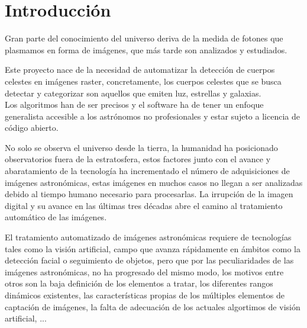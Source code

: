	\newpage
	\tableofcontents
	\newpage
	
	\section{Introducción}
	
	Gran parte del conocimiento del universo deriva de la medida de fotones que plasmamos en forma de imágenes, que más tarde son analizados y estudiados. 
	
	Este proyecto nace de la necesidad de automatizar la detección de cuerpos celestes en imágenes raster, concretamente, los cuerpos celestes que se busca detectar y categorizar son aquellos que emiten luz, estrellas y galaxias. \\
	Los algoritmos han de ser precisos y el software ha de tener un enfoque generalista accesible a los astrónomos no profesionales y estar sujeto a licencia de código abierto.
	
	No solo se observa el universo desde la tierra, la humanidad ha posicionado observatorios fuera de la estratosfera, estos factores junto con el avance y abaratamiento de la tecnología ha incrementado el número de adquisiciones de imágenes astronómicas, estas imágenes en muchos casos no llegan a ser analizadas debido al tiempo humano necesario para procesarlas. La irrupción de la imagen digital y su avance en las últimas tres décadas abre el camino al tratamiento automático de las imágenes.
	
	El tratamiento automatizado de imágenes astronómicas requiere de tecnologías tales como la visión artificial, campo que avanza rápidamente en ámbitos como la detección facial o seguimiento de objetos, pero que por las peculiaridades de las imágenes astronómicas, no ha progresado del mismo modo, los motivos entre otros son la baja definición de los elementos a tratar, los diferentes rangos dinámicos existentes, las características propias de los múltiples elementos de captación de imágenes, la falta de adecuación de los actuales algortimos de visión artificial, ...
	
